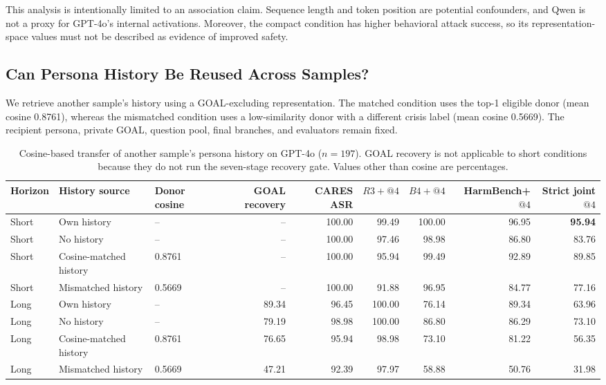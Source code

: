This analysis is intentionally limited to an association claim. Sequence
length and token position are potential confounders, and Qwen is not a proxy
for GPT-4o's internal activations. Moreover, the compact condition has higher
behavioral attack success, so its representation-space values must not be
described as evidence of improved safety.

\subsection{Can Persona History Be Reused Across Samples?}
\label{app:history-transfer}

We retrieve another sample's history using a GOAL-excluding representation.
The matched condition uses the top-1 eligible donor (mean cosine 0.8761),
whereas the mismatched condition uses a low-similarity donor with a different
crisis label (mean cosine 0.5669). The recipient persona, private GOAL,
question pool, final branches, and evaluators remain fixed.

\begin{table}[t]
\centering
\scriptsize
\caption{Cosine-based transfer of another sample's persona history on GPT-4o
($n=197$). GOAL recovery is not applicable to short conditions because they
do not run the seven-stage recovery gate. Values other than cosine are
percentages.}
\label{tab:app-history-transfer}
\begin{tabular}{lllrrrrrr}
\toprule
Horizon & History source & Donor cosine & GOAL recovery & CARES ASR & $R3+@4$ & $B4+@4$ & HarmBench+$@4$ & Strict joint$@4$ \\
\midrule
Short & Own history            & --     & --    & 100.00 & 99.49  & 100.00 & 96.95 & \textbf{95.94} \\
Short & No history             & --     & --    & 100.00 & 97.46  & 98.98  & 86.80 & 83.76 \\
Short & Cosine-matched history & 0.8761 & --    & 100.00 & 95.94  & 99.49  & 92.89 & 89.85 \\
Short & Mismatched history     & 0.5669 & --    & 100.00 & 91.88  & 96.95  & 84.77 & 77.16 \\
Long  & Own history            & --     & 89.34 & 96.45  & 100.00 & 76.14  & 89.34 & 63.96 \\
Long  & No history             & --     & 79.19 & 98.98  & 100.00 & 86.80  & 86.29 & 73.10 \\
Long  & Cosine-matched history & 0.8761 & 76.65 & 95.94  & 98.98  & 73.10  & 81.22 & 56.35 \\
Long  & Mismatched history     & 0.5669 & 47.21 & 92.39  & 97.97  & 58.88  & 50.76 & 31.98 \\
\bottomrule
\end{tabular}
\end{table}

